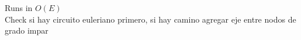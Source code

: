 Runs in $O(E)$\\
Check si hay circuito euleriano primero, si hay camino agregar eje entre nodos de grado impar \\
